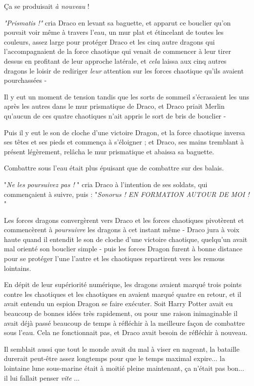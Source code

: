 Ça se produisait \emph{à nouveau}  !

\emph{"Prismatis !" } cria Draco en levant sa baguette, et apparut ce bouclier qu'on pouvait voir même à travers l'eau, un mur plat et étincelant de toutes les couleurs, assez large pour protéger Draco et les cinq autre dragons qui l'accompagnaient de la force chaotique qui venait de commencer à leur tirer dessus en profitant de leur approche latérale, et \emph{cela}  laissa aux cinq autres dragons le loisir de rediriger \emph{leur}  attention sur les forces chaotique qu'ils avaient pourchassées -

Il y eut un moment de tension tandis que les sorts de sommeil s'écrasaient les uns après les autres dans le mur prismatique de Draco, et Draco priait Merlin qu'aucun de ces quatre chaotiques n'ait appris le sort de bris de bouclier -

Puis il y eut le son de cloche d'une victoire Dragon, et la force chaotique inversa ses têtes et ses pieds et commença à s'éloigner ; et Draco, ses mains tremblant à présent légèrement, relâcha le mur prismatique et abaissa sa baguette.

Combattre sous l'eau était plus épuisant que de combattre sur des balais.

"\emph{Ne les poursuivez pas !} " cria Draco à l'intention de ses soldats, qui commençaient à suivre, puis : "\emph{Sonorus ! EN FORMATION AUTOUR DE MOI !} "

Les forces dragons convergèrent vers Draco et les forces chaotiques pivotèrent et commencèrent à \emph{poursuivre}  les dragons à cet instant même - Draco jura à voix haute quand il entendit le son de cloche d'une victoire chaotique, quelqu'un avait mal orienté son bouclier simple - puis les forces Dragon furent à bonne distance pour se protéger l'une l'autre et les chaotiques repartirent vers les remous lointains.

En dépit de leur supériorité numérique, les dragons avaient marqué trois points contre les chaotiques et les chaotiques en avaient marqué quatre en retour, et il avait entendu un espion Dragon se faire exécuter. Soit Harry Potter avait eu beaucoup de bonnes idées très rapidement, ou pour une raison inimaginable il avait déjà passé beaucoup de temps à réfléchir à la meilleure façon de combattre sous l'eau. Cela ne fonctionnait pas, et Draco avait besoin de réfléchir à nouveau.

Il semblait aussi que tout le monde avait du mal à viser en nageant, la bataille durerait peut-être assez longtemps pour que le temps maximal expire... la lointaine lune sous-marine était à moitié pleine maintenant, ça n'était pas bon... il lui fallait penser \emph{vite} ...

